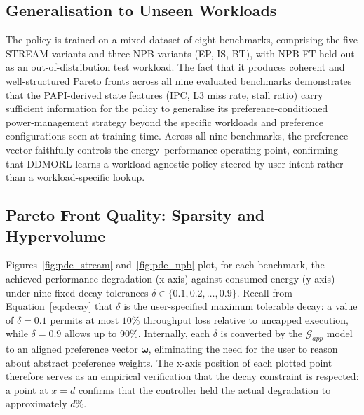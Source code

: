 \subsection{Generalisation to Unseen Workloads}

The policy is trained on a mixed dataset of eight benchmarks, comprising the five STREAM variants and three NPB variants (EP, IS, BT), with NPB-FT held out as an out-of-distribution test workload. The fact that it produces coherent and well-structured Pareto fronts across all nine evaluated benchmarks demonstrates that the PAPI-derived state features (IPC, L3 miss rate, stall ratio) carry sufficient information for the policy to generalise its preference-conditioned power-management strategy beyond the specific workloads and preference configurations seen at training time. Across all nine benchmarks, the preference vector faithfully controls the energy--performance operating point, confirming that DDMORL learns a workload-agnostic policy steered by user intent rather than a workload-specific lookup.

\subsection{Pareto Front Quality: Sparsity and Hypervolume}

Figures~\ref{fig:pde_stream} and~\ref{fig:pde_npb} plot, for each benchmark, the achieved performance degradation (x-axis) against consumed energy (y-axis) under nine fixed decay tolerances $\delta \in \{0.1, 0.2, \ldots, 0.9\}$. Recall from Equation~\ref{eq:decay} that $\delta$ is the user-specified maximum tolerable decay: a value of $\delta = 0.1$ permits at most $10\%$ throughput loss relative to uncapped execution, while $\delta = 0.9$ allows up to $90\%$. Internally, each $\delta$ is converted by the $\mathcal{G}_{app}$ model to an aligned preference vector $\boldsymbol{\omega}$, eliminating the need for the user to reason about abstract preference weights. The x-axis position of each plotted point therefore serves as an empirical verification that the decay constraint is respected: a point at $x = d$ confirms that the controller held the actual degradation to approximately $d\%$.

